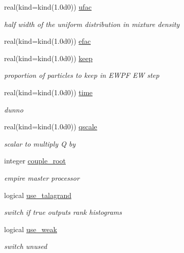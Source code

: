 \begin{DoxyCompactItemize}
real(kind=kind(1.\-0d0)) \hyperlink{structpf__control_1_1pf__control__type_a41d48f1ac4e0d69dcea1cd99a62fca90}{ufac}
\begin{DoxyCompactList}\small\item\em half width of the uniform distribution in mixture density \end{DoxyCompactList}\item 
real(kind=kind(1.\-0d0)) \hyperlink{structpf__control_1_1pf__control__type_a105254bf19b7d9582f187d6fefe3b8eb}{efac}
\item 
real(kind=kind(1.\-0d0)) \hyperlink{structpf__control_1_1pf__control__type_a32d13f7de6d41376980374e9ae2c2a62}{keep}
\begin{DoxyCompactList}\small\item\em proportion of particles to keep in E\-W\-P\-F E\-W step \end{DoxyCompactList}\item 
real(kind=kind(1.\-0d0)) \hyperlink{structpf__control_1_1pf__control__type_a4240d041987192d6b192b6910efeb29a}{time}
\begin{DoxyCompactList}\small\item\em dunno \end{DoxyCompactList}\item 
real(kind=kind(1.\-0d0)) \hyperlink{structpf__control_1_1pf__control__type_a48fc82562f2982c72312a1bba7d03d0d}{qscale}
\begin{DoxyCompactList}\small\item\em scalar to multiply Q by \end{DoxyCompactList}\item 
integer \hyperlink{structpf__control_1_1pf__control__type_a739b1b0b9ed322b84b834b9a185fe238}{couple\-\_\-root}
\begin{DoxyCompactList}\small\item\em empire master processor \end{DoxyCompactList}\item 
logical \hyperlink{structpf__control_1_1pf__control__type_a8acf4d56e3c012a8d5761ade51cfc48e}{use\-\_\-talagrand}
\begin{DoxyCompactList}\small\item\em switch if true outputs rank histograms \end{DoxyCompactList}\item 
logical \hyperlink{structpf__control_1_1pf__control__type_ac8097ede5f988970340635da9c936264}{use\-\_\-weak}
\begin{DoxyCompactList}\small\item\em switch unused \end{DoxyCompactList}\item 

\end{DoxyCompactItemize}
